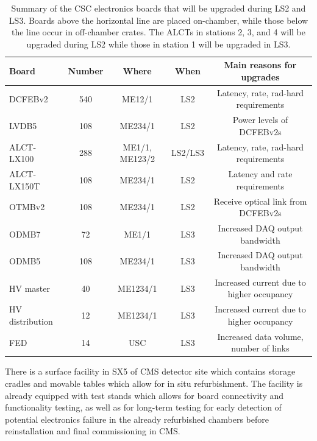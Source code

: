 \begin{table}[!htb]
 \footnotesize
\begin{center}
    \begin{tabular}{ | l | c | c | c |  c | }  \hline \hline
   Board   &  Number               &  Where          & When           &  Main reasons for upgrades  \\ \hline \hline
   DCFEBv2 &  540  &  ME12/1   &  LS2  &  Latency, rate, rad-hard requirements \\
   LVDB5 &  108  &  ME234/1   &  LS2  &  Power levels of DCFEBv2s \\
   ALCT-LX100 &  288  &  ME1/1, ME123/2   &  LS2/LS3  &  Latency, rate, rad-hard requirements \\
   ALCT-LX150T &  108  &  ME234/1   &  LS2  &  Latency and rate requirements \\ \hline
   OTMBv2 &  108  &  ME234/1   &  LS2  &  Receive optical link from DCFEBv2s \\
   ODMB7 &  72  &  ME1/1   &  LS3  &  Increased DAQ output bandwidth \\
   ODMB5 &  108  &  ME234/1   &  LS3  &  Increased DAQ output bandwidth \\
   HV master &  40  &  ME1234/1   &  LS3  &  Increased current due to higher occupancy \\  
   HV distribution &  12  &  ME1234/1   &  LS3  &  Increased current due to higher occupancy \\  
   FED &  14  &  USC   &  LS3  &  Increased data volume, number of links \\  \hline \hline
    \end{tabular}
    \caption{ Summary of the CSC electronics boards that will be upgraded during LS2 and LS3.
Boards above the horizontal line are placed on-chamber, while those below the line occur in
off-chamber crates. %
The ALCTs in stations 2, 3, and 4 will be upgraded during LS2 while those in station 1 will be upgraded
in LS3. 
	}
    \label{electronics_upgrades}
\end{center}
\end{table}
\par There is a surface facility in SX5 of CMS detector site which contains storage cradles and movable tables which
allow for in situ refurbishment. The facility is already equipped with test stands
which allows for board connectivity and functionality testing, as well as for long-term testing for early detection of potential electronics failure in the already refurbished chambers before reinstallation and final commissioning in CMS.

